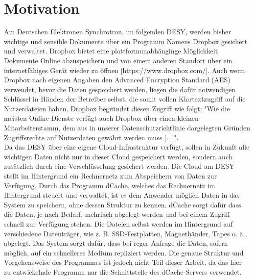 \documentclass[10pt, a4paper,headsepline]{scrreprt}
\begin{document}
\section{Motivation}
Am Deutschen Elektronen Synchrotron, im folgenden DESY, werden bisher wichtige und sensible Dokumente über ein Programm Namens Dropbox gesichert und verwaltet. Dropbox bietet eine plattformunabhänginge Möglichkeit Dokumente Online abzuspeichern und von einem anderen Standort über ein internetfähiges Gerät wieder zu öffnen [https://www.dropbox.com/]. Auch wenn Dropbox nach eigenen Angaben den Advanced Encryption Standard (AES)  verwendet, bevor die Daten gespeichert werden, liegen die dafür notwendigen Schlüssel in Händen der Betreiber selbst, die somit vollen Klartextzugriff auf die Nutzerdateien haben. Dropbox begründet diesen Zugriff wie folgt:  "Wie die meisten Online-Dienste verfügt auch Dropbox über einen kleinen Mitarbeiterstamm, dem aus in unserer Datenschutzrichtlinie dargelegten Gründen Zugriffsrechte auf Nutzerdaten gewährt werden muss [...]". \\ %
Da das DESY über eine eigene Cloud-Infrastruktur verfügt, sollen in Zukunft alle wichtigen Daten nicht nur in dieser Cloud gespeichert werden, sondern auch zusätzlich durch eine Verschlüsselung gesichert werden. Die Cloud am DESY stellt im Hintergrund ein Rechnernetz zum Abspeichern von Daten zur Verfügung. Durch das Programm dCache, welches das Rechnernetz im Hintergrund steuert und verwaltet, ist es dem Anwender möglich Daten in das System zu speichern, ohne dessen Struktur zu kennen. dCache sorgt dafür dass die Daten, je nach Bedarf, mehrfach abgelegt werden und bei einem Zugriff schnell zur Verfügung stehen. Die Dateien selbst werden im Hintergrund auf verschiedene Datenträger, wie z. B. SSD-Festplatten, Magnetbänder, Tapes o. ä., abgelegt. Das System sorgt dafür, dass bei reger Anfrage die Daten, sofern möglich, auf ein schnelleres Medium repliziert werden. Die genaue Struktur und Vorgehensweise des Programmes ist jedoch nicht Teil dieser Arbeit, da das hier zu entwickelnde Programm nur die Schnittstelle des dCache-Servers verwendet.
\end{document}
